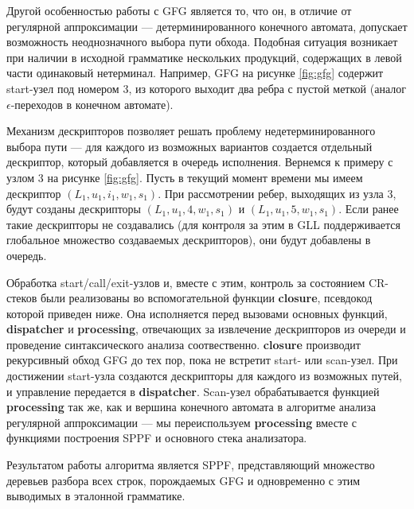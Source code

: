 Другой особенностью работы с GFG является то, что он, в отличие от регулярной аппроксимации --- детерминированного конечного автомата, допускает возможность неоднозначного выбора пути обхода. 
Подобная ситуация возникает при наличии в исходной грамматике нескольких продукций, содержащих в левой части одинаковый нетерминал. 
Например, GFG на рисунке \ref{fig:gfg} содержит start-узел под номером 3, из которого выходит два ребра с пустой меткой (аналог $\epsilon$-переходов в конечном автомате).

Механизм дескрипторов позволяет решать проблему недетерминированного выбора пути --- для каждого из возможных вариантов создается отдельный дескриптор, который добавляется в очередь исполнения. 
Вернемся к примеру с узлом 3 на рисунке \ref{fig:gfg}. Пусть в текущий момент времени мы имеем дескриптор $(L_1, u_1, i_1, w_1, s_1)$. 
При рассмотрении ребер, выходящих из узла 3, будут созданы дескрипторы $(L_1, u_1, 4, w_1, s_1)$ и $(L_1, u_1, 5, w_1, s_1)$. Если ранее такие дескрипторы не создавались (для контроля за этим в GLL поддерживается глобальное множество создаваемых дескрипторов), они будут добавлены в очередь.

Обработка start/call/exit-узлов и, вместе с этим, контроль за состоянием CR-стеков были реализованы во вспомогательной функции \textbf{closure}, псевдокод которой приведен ниже.
Она исполняется перед вызовами основных функций, \textbf{dispatcher} и \textbf{processing}, отвечающих за извлечение дескрипторов из очереди и проведение синтаксического анализа соотвественно.
\textbf{closure} производит рекурсивный обход GFG до тех пор, пока не встретит start- или scan-узел. 
При достижении start-узла создаются дескрипторы для каждого из возможных путей, и управление передается в \textbf{dispatcher}. Scan-узел обрабатывается функцией \textbf{processing} так же, как и вершина конечного автомата в алгоритме анализа регулярной аппроксимации --- мы переиспользуем \textbf{processing} вместе с функциями построения SPPF и основного стека анализатора.




Результатом работы алгоритма является SPPF, представляющий множество деревьев разбора всех строк, порождаемых GFG и одновременно с этим выводимых в эталонной грамматике.